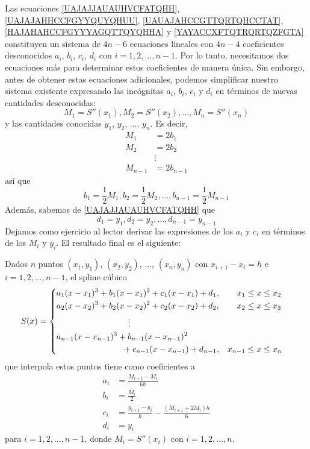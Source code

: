 Las ecuaciones \eqref{UAJAJJAUAUHVCFATQHH}, \eqref{UAJAJAHHCCFGYYQUYQHUU}, \eqref{UAUAJAHCCGTTQRTQHCCTAT}, \eqref{HAJAHAHCCFGYYYAGQTTQYQHHA} y \eqref{YAYACCXFTQTRQRTQZFGTA} constituyen un sistema de $4n - 6$ ecuaciones lineales con $4n - 4$ coeficientes desconocidos $a_i$, $b_i$, $c_i$, $d_i$ con $i = 1, 2, \dots, n-1$. Por lo tanto, necesitamos dos ecuaciones más para determinar estos coeficientes de manera única. Sin embargo, antes de obtener estas ecuaciones adicionales, podemos simplificar nuestro sistema existente expresando las incógnitas $a_i$, $b_i$, $c_i$ y $d_i$ en términos de nuevas cantidades desconocidas:
$$M_1 = S''(x_1), M_2 = S''(x_2), \dots, M_n = S''(x_n)$$
y las cantidades conocidas $y_1$, $y_2$, $\dots$, $y_n$. Es decir,
\begin{align*}
    M_1 & = 2b_1 \\
    M_2 & = 2b_2 \\
    & \vdots \\
    M_{n-1} & = 2b_{n-1}
\end{align*}
así que
$$b_1 = \frac{1}{2}M_1, b_2 = \frac{1}{2}M_2, \dots, b_{n-1} = \frac{1}{2}M_{n-1}$$
Además, sabemos de \eqref{UAJAJJAUAUHVCFATQHH} que
$$d_1 = y_1, d_2 = y_2, \dots, d_{n-1} = y_{n-1}$$
Dejamos como ejercicio al lector derivar las expresiones de los $a_i$ y $c_i$ en términos de los $M_i$ y $y_i$. El resultado final es el siguiente:
\begin{theorem}
    Dados $n$ puntos $(x_1, y_1)$, $(x_2, y_2)$, $\dots$, $(x_n, y_n)$ con $x_{i+1} - x_i = h$ e $i = 1, 2, \dots, n - 1$, el spline cúbico
    $$S(x) = \begin{cases}
        \begin{aligned}
            & a_1(x - x_1)^3 + b_1(x - x_1)^2 + c_1(x - x_1) + d_1, & x_1 & \leq x \leq x_2 \\
            & a_2(x - x_2)^3 + b_2(x - x_2)^2 + c_2(x - x_2) + d_2, & x_2 & \leq x \leq x_3 \\
            & \hspace{3cm} \vdots & & \\
            & a_{n-1}(x - x_{n-1})^3 + b_{n-1}(x - x_{n-1})^2 & & \\
            & \hspace{2.75cm} + c_{n-1}(x - x_{n-1}) + d_{n-1}, & x_{n-1} & \leq x \leq x_n
        \end{aligned}
    \end{cases}$$
    que interpola estos puntos tiene como coeficientes a
    \begin{equation}
        \begin{aligned}
            a_i & = \frac{M_{i+1} - M_i}{6h} \\
            b_i & = \frac{M_i}{2} \\
            c_i & = \frac{y_{i+1} - y_i}{h} - \frac{(M_{i+1} + 2M_i)h}{6} \\
            d_i & = y_i
        \end{aligned} \label{JAJAJAIIQIQUQJAHHAVGH}
    \end{equation}
    para $i = 1, 2, \dots, n - 1$, donde $M_i = S''(x_i)$ con $i = 1, 2, \dots, n$.
\end{theorem}

